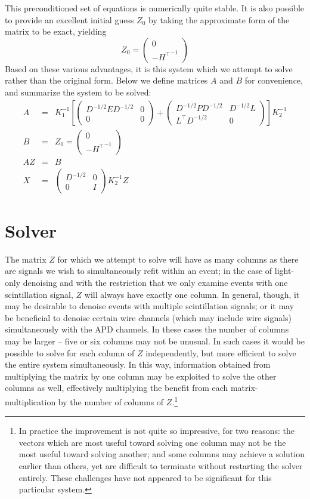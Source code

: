 This preconditioned set of equations is numerically quite stable.  It is also possible to provide an excellent initial guess $Z_0$ by taking the approximate form of the matrix to be exact, yielding
\[
Z_0 = \begin{pmatrix}0\\-{H^\top}^{-1}\end{pmatrix}
\]
Based on these various advantages, it is this system which we attempt to solve rather than the original form.  Below we define matrices $A$ and $B$ for convenience, and summarize the system to be solved:
\[\begin{array}{rcl}
A &=& K_1^{-1} 
\left[
\begin{pmatrix}D^{-1/2}ED^{-1/2}&0\\0&0\end{pmatrix}
+
\begin{pmatrix}D^{-1/2}PD^{-1/2}&D^{-1/2}L\\L^\top D^{-1/2}&0\end{pmatrix}
\right]
K_2^{-1}\\
B &=& Z_0 = \begin{pmatrix}0\\-{H^\top}^{-1}\end{pmatrix}\\
AZ &=& B\\
X &=&  \begin{pmatrix}D^{-1/2}&0\\0&I\end{pmatrix}K_2^{-1}Z
\end{array}\]


\section{Solver}

The matrix $Z$ for which we attempt to solve will have as many columns as there are signals we wish to simultaneously refit within an event; in the case of light-only denoising and with the restriction that we only examine events with one scintillation signal, $Z$ will always have exactly one column.  In general, though, it may be desirable to denoise events with multiple scintillation signals; or it may be beneficial to denoise certain wire channels (which may include wire signals) simultaneously with the APD channels.  In these cases the number of columns may be larger -- five or six columns may not be unusual.  In such cases it would be possible to solve for each column of $Z$ independently, but more efficient to solve the entire system simultaneously.  In this way, information obtained from multiplying the matrix by one column may be exploited to solve the other columns as well, effectively multiplying the benefit from each matrix-multiplication by the number of columns of $Z$.\footnote{In practice the improvement is not quite so impressive, for two reasons: the vectors which are most useful toward solving one column may not be the most useful toward solving another; and some columns may achieve a solution earlier than others, yet are difficult to terminate without restarting the solver entirely.  These challenges have not appeared to be significant for this particular system.}

